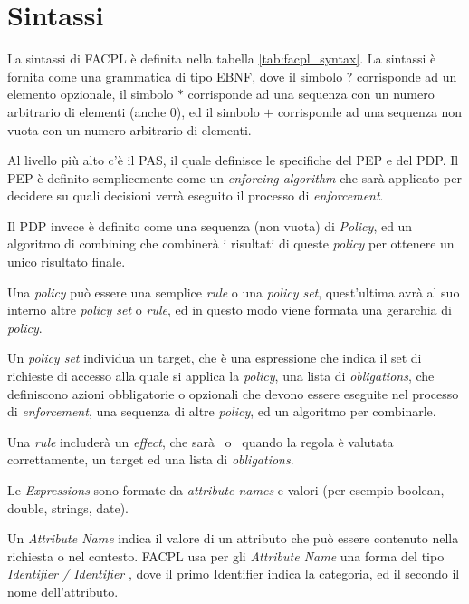 \section{Sintassi}
\label{sec:facpl_syntax}



La sintassi di FACPL è definita nella tabella \ref{tab:facpl_syntax}.
La sintassi è fornita come una grammatica di tipo EBNF, dove il simbolo ? corrisponde ad un elemento opzionale, il simbolo $*$ corrisponde ad una sequenza con un numero arbitrario di elementi (anche $0$), ed il simbolo $+$ corrisponde ad una sequenza non vuota con un numero arbitrario di elementi. \par
Al livello più alto c'è il \ac{PAS}, il quale definisce le specifiche del \ac{PEP} e del \ac{PDP}. Il \ac{PEP} è definito semplicemente come un \textit{enforcing algorithm} che sarà applicato per decidere su quali decisioni verrà eseguito il processo di \textit{enforcement}.  \par
Il PDP invece è definito come una sequenza (non vuota) di \textit{Policy}, ed un algoritmo di combining che combinerà i risultati di queste \textit{policy} per ottenere un unico risultato finale. \par
Una \textit{policy} può essere una semplice \textit{rule} o una \textit{policy set}, quest'ultima avrà al suo interno altre \textit{policy set} o \textit{rule}, ed in questo modo viene formata una gerarchia di \textit{policy}. \par
Un \textit{policy set} individua un target, che è una espressione che indica il set di richieste di accesso alla quale si applica la \textit{policy}, una lista di \textit{obligations}, che definiscono azioni obbligatorie o opzionali che devono essere eseguite nel processo di \textit{enforcement}, una sequenza di altre \textit{policy}, ed un algoritmo per combinarle. \par
Una \textit{rule} includerà un \textit{effect}, che sarà \permit \ o \deny \ quando la regola è valutata correttamente, un target ed una lista di \textit{obligations}. \par
Le \textit{Expressions} sono formate da \textit{attribute names} e valori (per esempio boolean, double, strings, date). \par
Un \textit{Attribute Name} indica il valore di un attributo che può essere contenuto nella richiesta o nel contesto. FACPL usa per gli \textit{Attribute Name} una forma del tipo \textit{Identifier / Identifier }, dove il primo Identifier indica la categoria, ed il secondo il nome dell'attributo.
